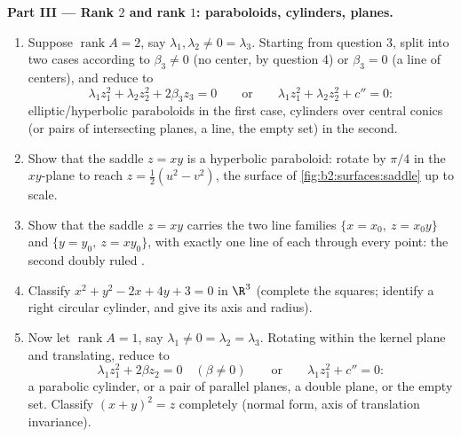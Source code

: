 \begin{problem}
\medskip
\noindent\textbf{Part III --- Rank $2$ and rank $1$:
paraboloids, cylinders, planes.}
\begin{enumerate}[resume]
  \item Suppose $\operatorname{rank}A = 2$, say $\lambda_1,
        \lambda_2 \neq 0 = \lambda_3$. Starting from question
        3, split into two cases according to $\beta_3 \neq 0$
        (no center, by question 4) or $\beta_3 = 0$ (a line
        of centers), and reduce to
        \[
        \lambda_1z_1^2 + \lambda_2z_2^2 + 2\beta_3z_3 = 0
        \qquad\text{or}\qquad
        \lambda_1z_1^2 + \lambda_2z_2^2 + c'' = 0 :
        \]
        elliptic/hyperbolic paraboloids in the first case,
        cylinders over central conics (or pairs of
        intersecting planes, a line, the empty set) in the
        second.
  \item Show that the saddle $z = xy$ is a hyperbolic
        paraboloid: rotate by $\pi/4$ in the $xy$-plane to
        reach $z = \tfrac12(u^2 - v^2)$, the surface of
        \cref{fig:b2:surfaces:saddle} up to scale.
  \item Show that the saddle $z = xy$ carries the two line
        families $\{x = x_0,\ z = x_0y\}$ and $\{y = y_0,\ z
        = xy_0\}$, with exactly one line of each through
        every point: the second doubly ruled .
  \item Classify $x^2 + y^2 - 2x + 4y + 3 = 0$ in $\R^3$
        (complete the squares; identify a right circular
        cylinder, and give its axis and radius).
  \item Now let $\operatorname{rank}A = 1$, say $\lambda_1
        \neq 0 = \lambda_2 = \lambda_3$. Rotating within the
        kernel plane and translating, reduce to
        \[
        \lambda_1z_1^2 + 2\beta z_2 = 0 \quad (\beta \neq 0)
        \qquad\text{or}\qquad
        \lambda_1z_1^2 + c'' = 0 :
        \]
        a parabolic cylinder, or a pair of parallel planes, a
        double plane, or the empty set. Classify $(x + y)^2 =
        z$ completely (normal form, axis of translation
        invariance).
\end{enumerate}


\end{problem}
